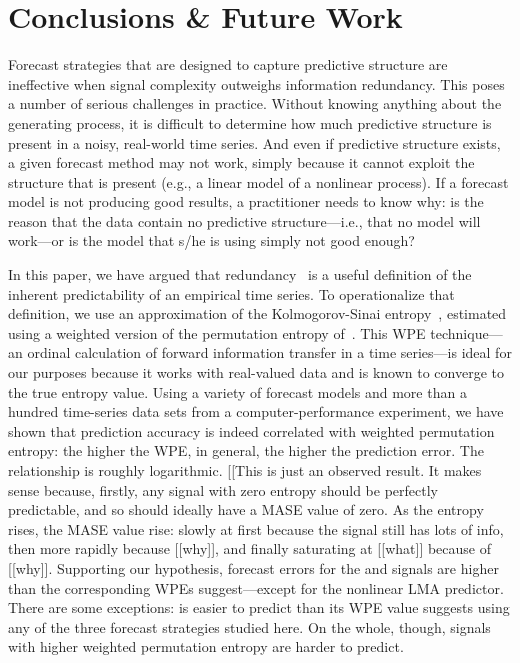 \section{ Conclusions \& Future Work }\label{sec:conc}

Forecast strategies that are designed to capture predictive structure
are ineffective when signal complexity outweighs information
redundancy.  This poses a number of serious challenges in practice.
Without knowing anything about the generating process, it is difficult
to determine how much predictive structure is present in a noisy,
real-world time series.  And even if predictive structure exists, a
given forecast method may not work, simply because it cannot exploit
the structure that is present (e.g., a linear model of a nonlinear
process).  If a forecast model is not producing good results, a
practitioner needs to know why: is the reason that the data contain no
predictive structure---i.e., that no model will work---or is the model
that s/he is using simply not good enough?

In this paper, we have argued that redundancy~\cite{crutchfield2003}
is a useful definition of the inherent predictability of an empirical
time series.  To operationalize that definition, we use an
approximation of the Kolmogorov-Sinai entropy~\cite{lind95}, estimated
using a weighted version of the permutation entropy
of~\cite{bandt2002per}.  This WPE technique---an ordinal calculation
of forward information transfer in a time series---is ideal for our
purposes because it works with real-valued data and is known to
converge to the true entropy value. Using a variety of forecast models
and more than a hundred time-series data sets from a
computer-performance experiment, we have shown that prediction
accuracy is indeed correlated with weighted permutation entropy: the
higher the WPE, in general, the higher the prediction error.  The
relationship is roughly logarithmic.  [[This is just an observed result.
It makes sense because, firstly, any signal with zero entropy should
be perfectly predictable, and so should ideally have a MASE value of
zero.  As the entropy rises, the MASE value rise: slowly at first
because the signal still has lots of info, then more rapidly because
[[why]], and finally saturating at [[what]] because of [[why]].
Supporting our hypothesis, forecast errors for the \col and \svdfive
signals are higher than the corresponding WPEs suggest---except for
the nonlinear LMA predictor.  There are some exceptions: \svdone is
easier to predict than its WPE value suggests using any of the three
forecast strategies studied here.  On the whole, though, signals with
higher weighted permutation entropy are harder to predict.

